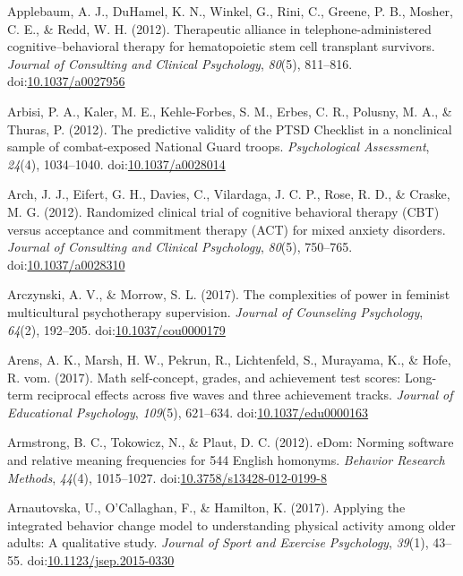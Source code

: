 \documentclass[english,man]{apa6}
\begin{document}
\hypertarget{ref-Applebaum2012}{}
Applebaum, A. J., DuHamel, K. N., Winkel, G., Rini, C., Greene, P. B.,
Mosher, C. E., \& Redd, W. H. (2012). Therapeutic alliance in
telephone-administered cognitive--behavioral therapy for hematopoietic
stem cell transplant survivors. \emph{Journal of Consulting and Clinical
Psychology}, \emph{80}(5), 811--816.
doi:\href{https://doi.org/10.1037/a0027956}{10.1037/a0027956}

\hypertarget{ref-Arbisi2012}{}
Arbisi, P. A., Kaler, M. E., Kehle-Forbes, S. M., Erbes, C. R., Polusny,
M. A., \& Thuras, P. (2012). The predictive validity of the PTSD
Checklist in a nonclinical sample of combat-exposed National Guard
troops. \emph{Psychological Assessment}, \emph{24}(4), 1034--1040.
doi:\href{https://doi.org/10.1037/a0028014}{10.1037/a0028014}

\hypertarget{ref-Arch2012}{}
Arch, J. J., Eifert, G. H., Davies, C., Vilardaga, J. C. P., Rose, R.
D., \& Craske, M. G. (2012). Randomized clinical trial of cognitive
behavioral therapy (CBT) versus acceptance and commitment therapy (ACT)
for mixed anxiety disorders. \emph{Journal of Consulting and Clinical
Psychology}, \emph{80}(5), 750--765.
doi:\href{https://doi.org/10.1037/a0028310}{10.1037/a0028310}

\hypertarget{ref-Arczynski2017}{}
Arczynski, A. V., \& Morrow, S. L. (2017). The complexities of power in
feminist multicultural psychotherapy supervision. \emph{Journal of
Counseling Psychology}, \emph{64}(2), 192--205.
doi:\href{https://doi.org/10.1037/cou0000179}{10.1037/cou0000179}

\hypertarget{ref-Arens2017}{}
Arens, A. K., Marsh, H. W., Pekrun, R., Lichtenfeld, S., Murayama, K.,
\& Hofe, R. vom. (2017). Math self-concept, grades, and achievement test
scores: Long-term reciprocal effects across five waves and three
achievement tracks. \emph{Journal of Educational Psychology},
\emph{109}(5), 621--634.
doi:\href{https://doi.org/10.1037/edu0000163}{10.1037/edu0000163}

\hypertarget{ref-Armstrong2012}{}
Armstrong, B. C., Tokowicz, N., \& Plaut, D. C. (2012). eDom: Norming
software and relative meaning frequencies for 544 English homonyms.
\emph{Behavior Research Methods}, \emph{44}(4), 1015--1027.
doi:\href{https://doi.org/10.3758/s13428-012-0199-8}{10.3758/s13428-012-0199-8}

\hypertarget{ref-Arnautovska2017}{}
Arnautovska, U., O'Callaghan, F., \& Hamilton, K. (2017). Applying the
integrated behavior change model to understanding physical activity
among older adults: A qualitative study. \emph{Journal of Sport and
Exercise Psychology}, \emph{39}(1), 43--55.
doi:\href{https://doi.org/10.1123/jsep.2015-0330}{10.1123/jsep.2015-0330}
\end{document}
